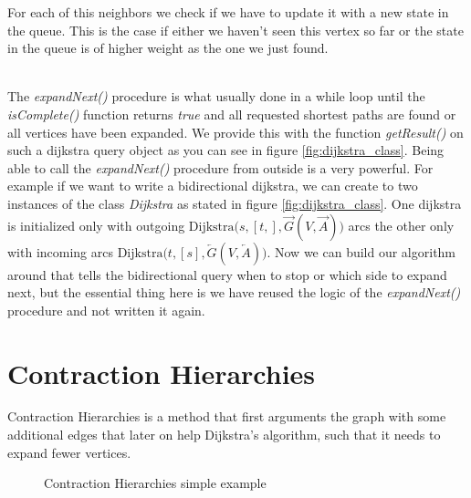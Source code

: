 For each of this neighbors we check if we have to update it with a new state in the queue.
This is the case if either we haven't seen this vertex so far or the state in the queue is of higher weight as the one we just found.

\\
The \textit{expandNext()} procedure is what usually done in a while loop until the \textit{isComplete()} function returns \textit{true} and all requested shortest paths are found or all vertices have been expanded.
We provide this with the function \textit{getResult()} on such a dijkstra query object as you can see in figure \ref{fig:dijkstra_class}.
Being able to call the \textit{expandNext()} procedure from outside is a very powerful.
For example if we want to write a bidirectional dijkstra, we can create to two instances of the class \textit{Dijkstra} as stated in figure \ref{fig:dijkstra_class}.
One dijkstra is initialized only with outgoing $\text{Dijkstra(}s, [t,], \overrightarrow{G}(V, \overrightarrow{A}) \text{)}$ arcs the other only with incoming arcs $\text{Dijkstra(}t, [s], \overleftarrow{G}(V, \overleftarrow{A}) \text{)}$.
Now we can build our algorithm around that tells the bidirectional query when to stop or which side to expand next, but the essential thing here is we have reused the logic of the \textit{expandNext()} procedure and not written it again.

\section{Contraction Hierarchies}

Contraction Hierarchies \cite{Sanders} is a method that first arguments the graph with some additional edges that later on help Dijkstra's algorithm, such that it needs to expand fewer vertices.

\begin{figure}[H]
    \centering
    
    \caption{Contraction Hierarchies simple example}
    \label{fig:ch_simple_example}
\end{figure}

